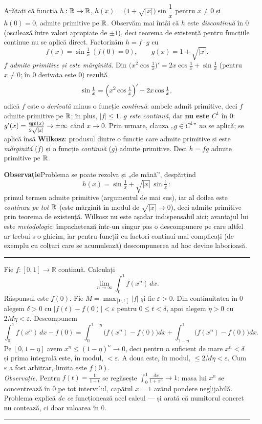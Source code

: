 Arătați că funcția $h : \mathbb{R} \to \mathbb{R}$, $h(x) = \bigl(1 + \sqrt{|x|}\bigr) \sin \dfrac{1}{x}$ pentru $x \neq 0$ și $h(0) = 0$, admite primitive pe $\mathbb{R}$.
\sol Observăm mai întâi că $h$ este \emph{discontinuă} în $0$ (oscilează între valori apropiate de $\pm 1$), deci teorema de existență pentru funcțiile continue nu se aplică direct. Factorizăm $h = f \cdot g$ cu
\[
f(x) = \sin \tfrac{1}{x} \ (f(0) = 0), \qquad g(x) = 1 + \sqrt{|x|}.
\]
\emph{$f$ admite primitive și este mărginită.} Din $\bigl(x^2 \cos \tfrac{1}{x}\bigr)' = 2x \cos \tfrac{1}{x} + \sin \tfrac{1}{x}$ (pentru $x \neq 0$; în $0$ derivata este $0$) rezultă
\[
\sin \tfrac{1}{x} = \Bigl(x^2 \cos \tfrac{1}{x}\Bigr)' - 2x \cos \tfrac{1}{x},
\]
adică $f$ este o \emph{derivată} minus o funcție \emph{continuă}: ambele admit primitive, deci $f$ admite primitive pe $\mathbb{R}$; în plus, $|f| \leq 1$. \emph{$g$ este continuă}, dar \textbf{nu este} $C^1$ în $0$: $g'(x) = \frac{\operatorname{sgn}(x)}{2\sqrt{|x|}} \to \pm\infty$ când $x \to 0$. Prin urmare, clauza „$g \in C^1$'' \emph{nu} se aplică; se aplică însă \textbf{Wilkosz}: produsul dintre o funcție care admite primitive și este \emph{mărginită} ($f$) și o funcție \emph{continuă} ($g$) admite primitive. Deci $h = fg$ admite primitive pe $\mathbb{R}$.

\medskip
\noindent\textbf{Observație}\quad Problema se poate rezolva și „de mână'', despărțind
\[
h(x) = \sin \tfrac{1}{x} + \sqrt{|x|} \, \sin \tfrac{1}{x} \,:
\]
primul termen admite primitive (argumentul de mai sus), iar al doilea este \emph{continuu pe tot $\mathbb{R}$} (este mărginit în modul de $\sqrt{|x|} \to 0$), deci admite primitive prin teorema de existență. Wilkosz nu este așadar indispensabil aici; avantajul lui este \emph{metodologic}: împachetează într-un singur pas o descompunere pe care altfel ar trebui s-o ghicim, iar pentru funcții cu factori continui mai complicați (de exemplu cu colțuri care se acumulează) descompunerea ad hoc devine laborioasă.
\vspace{1mm}\hrule

Fie $f:[0,1]\to\mathbb{R}$ continuă. Calculați
\[ \lim_{n\to\infty}\int_0^1 f(x^n)\,dx. \]
\sol Răspunsul este $f(0)$. Fie $M=\max_{[0,1]}|f|$ și fie $\varepsilon>0$.
Din continuitatea în $0$ alegem $\delta>0$ cu $|f(t)-f(0)|<\varepsilon$ pentru
$0\le t<\delta$, apoi alegem $\eta>0$ cu $2M\eta<\varepsilon$. Descompunem
\[ \int_0^1 f(x^n)\,dx-f(0)=\int_0^{1-\eta}\bigl(f(x^n)-f(0)\bigr)dx
   +\int_{1-\eta}^{1}\bigl(f(x^n)-f(0)\bigr)dx. \]
Pe $[0,1-\eta]$ avem $x^n\le(1-\eta)^n\to0$, deci pentru $n$ suficient de mare
$x^n<\delta$ și prima integrală este, în modul, $<\varepsilon$. A doua este, în
modul, $\le 2M\eta<\varepsilon$. Cum $\varepsilon$ a fost arbitrar, limita este
$f(0)$.\\[2pt]
\emph{Observație.} Pentru $f(t)=\frac{1}{1+t}$ se regăsește $\int_0^1\frac{dx}{1+x^n}\to1$:
masa lui $x^n$ se concentrează în $0$ pe tot intervalul, capătul $x=1$ având
pondere neglijabilă. Problema explică \emph{de ce} funcționează acel calcul ---
și arată că numitorul concret nu contează, ci doar valoarea în $0$.
\vspace{1mm}\hrule

